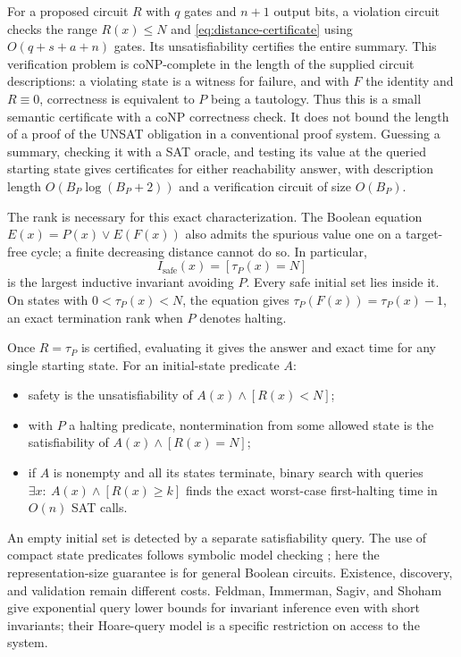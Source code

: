 \documentclass[11pt]{article}
\theoremstyle{definition}
\theoremstyle{remark}
\numberwithin{equation}{section}
\begin{document}
For a proposed circuit $R$ with $q$ gates and $n+1$ output bits, a violation circuit
checks the range $R(x)\leq N$ and \cref{eq:distance-certificate} using
$O(q+s+a+n)$ gates.  Its unsatisfiability certifies the entire
summary.  This verification problem is coNP-complete in the length of
the supplied circuit descriptions: a violating state is a witness for
failure, and with $F$ the identity and $R\equiv0$, correctness is
equivalent to $P$ being a tautology.  Thus this is a small semantic
certificate with a coNP correctness check.  It does not bound the length
of a proof of the UNSAT obligation in a conventional proof system.
Guessing a summary, checking it with a SAT oracle, and testing its value
at the queried starting state gives certificates for either reachability
answer, with description length
$O(B_P\log(B_P+2))$ and a verification circuit of size $O(B_P)$.

The rank is necessary for this exact characterization.  The Boolean
equation $E(x)=P(x)\lor E(F(x))$ also admits the spurious value one on a
target-free cycle; a finite decreasing distance cannot do so.
In particular,
\[
 I_{\mathrm{safe}}(x)=[\tau_P(x)=N]
\]
is the largest inductive invariant avoiding $P$.  Every safe initial
set lies inside it.  On states with $0<\tau_P(x)<N$, the equation gives
$\tau_P(F(x))=\tau_P(x)-1$, an exact termination rank when $P$ denotes
halting.

Once $R=\tau_P$ is certified, evaluating it gives the answer and exact
time for any single starting state.  For an initial-state predicate $A$:
\begin{itemize}
\item safety is the unsatisfiability of $A(x)\land[R(x)<N]$;
\item with $P$ a halting predicate, nontermination from some allowed
  state is the satisfiability of $A(x)\land[R(x)=N]$;
\item if $A$ is nonempty and all its states terminate, binary search
  with queries $\exists x:\ A(x)\land[R(x)\geq k]$ finds the exact
  worst-case first-halting time in $O(n)$ SAT calls.
\end{itemize}
An empty initial set is detected by a separate satisfiability query.
The use of compact state predicates follows symbolic model checking
\cite{BCMDH90}; here the representation-size guarantee is for general
Boolean circuits.  Existence, discovery, and validation remain different
costs.  Feldman, Immerman, Sagiv, and Shoham \cite{FISS20} give exponential
query lower bounds for invariant inference even with short invariants;
their Hoare-query model is a specific restriction on access to the system.
\end{document}
